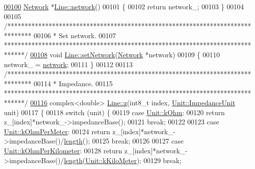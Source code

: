 \begin{DoxyCode}
\hypertarget{line_8cpp_source_l00100}{}\hyperlink{group___models_gaa4cfa330c9c53ddaf86c8f5c17ba1ee0}{00100} \hyperlink{class_network}{Network} *\hyperlink{group___models_gaa4cfa330c9c53ddaf86c8f5c17ba1ee0}{Line::network}()
00101 \{
00102   \textcolor{keywordflow}{return} network\_;
00103 \}
00104 
00105 \textcolor{comment}{/*******************************************************************************}
00106 \textcolor{comment}{ * Set network.}
00107 \textcolor{comment}{ ******************************************************************************/}
\hypertarget{line_8cpp_source_l00108}{}\hyperlink{group___models_ga320766e09f0ea36b2dd07d3b1db1b72e}{00108} \textcolor{keywordtype}{void} \hyperlink{group___models_ga320766e09f0ea36b2dd07d3b1db1b72e}{Line::setNetwork}(\hyperlink{class_network}{Network} *network)
00109 \{
00110   network\_ = \hyperlink{group___models_gaa4cfa330c9c53ddaf86c8f5c17ba1ee0}{network};
00111 \}
00112 
00113 \textcolor{comment}{/*******************************************************************************}
00114 \textcolor{comment}{ * Impedance.}
00115 \textcolor{comment}{ ******************************************************************************/}
\hypertarget{line_8cpp_source_l00116}{}\hyperlink{group___models_ga0b44ccb2f14635c42d7eab3fe8940692}{00116} complex<double> \hyperlink{group___models_ga0b44ccb2f14635c42d7eab3fe8940692}{Line::z}(int8\_t index, \hyperlink{class_unit_a3747e779c805df24a71961290be3fbdf}{Unit::ImpedanceUnit} unit)
00117 \{
00118   \textcolor{keywordflow}{switch} (unit) \{
00119   \textcolor{keywordflow}{case} \hyperlink{class_unit_a3747e779c805df24a71961290be3fbdfa6b9c74d1763eefbaf751eeecff0bd9da}{Unit::kOhm}:
00120     \textcolor{keywordflow}{return} z\_[index]*network\_->impedanceBase();
00121     \textcolor{keywordflow}{break};
00122 
00123   \textcolor{keywordflow}{case} \hyperlink{class_unit_a3747e779c805df24a71961290be3fbdfa35e9ca44deb5a35fdb576111cf0db336}{Unit::kOhmPerMeter}:
00124     \textcolor{keywordflow}{return} z\_[index]*network\_->impedanceBase()/\hyperlink{group___models_gae2e4500d0fa60dcc2ecb08b2c96954f9}{length}();
00125     \textcolor{keywordflow}{break};
00126 
00127   \textcolor{keywordflow}{case} \hyperlink{class_unit_a3747e779c805df24a71961290be3fbdfa56a0289d2ddeff7ca4aa8ba410df79d6}{Unit::kOhmPerKilometer}:
00128     \textcolor{keywordflow}{return} z\_[index]*network\_->impedanceBase()/\hyperlink{group___models_gae2e4500d0fa60dcc2ecb08b2c96954f9}{length}(\hyperlink{class_unit_a8c8921f7b225ad6063b1cb573425b9a0a1c04f3dd196dbe1832a2658215b0d919}{Unit::kKiloMeter});
00129     \textcolor{keywordflow}{break};

\end{DoxyCode}
